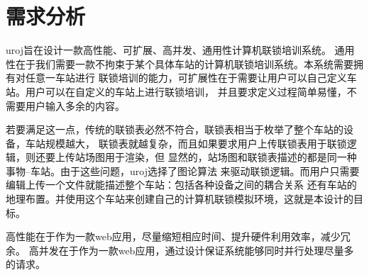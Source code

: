 \section{需求分析}
uroj旨在设计一款高性能、可扩展、高并发、通用性计算机联锁培训系统。
通用性在于我们需要一款不拘束于某个具体车站的计算机联锁培训系统。本系统需要拥有对任意一车站进行
联锁培训的能力，可扩展性在于需要让用户可以自己定义车站。用户可以在自定义的车站上进行联锁培训，
并且要求定义过程简单易懂，不需要用户输入多余的内容。

若要满足这一点，传统的联锁表必然不符合，联锁表相当于枚举了整个车站的设备，车站规模越大，
联锁表就越复杂，而且如果要求用户上传联锁表用于联锁逻辑，则还要上传站场图用于渲染，但
显然的，站场图和联锁表描述的都是同一种事物--车站。由于这些问题，uroj选择了图论算法
来驱动联锁逻辑。而用户只需要编辑上传一个文件就能描述整个车站：包括各种设备之间的耦合关系
还有车站的地理布置。并使用这个车站来创建自己的计算机联锁模拟环境，这就是本设计的目标。


高性能在于作为一款web应用，尽量缩短相应时间、提升硬件利用效率，减少冗余。
高并发在于作为一款web应用，通过设计保证系统能够同时并行处理尽量多的请求。